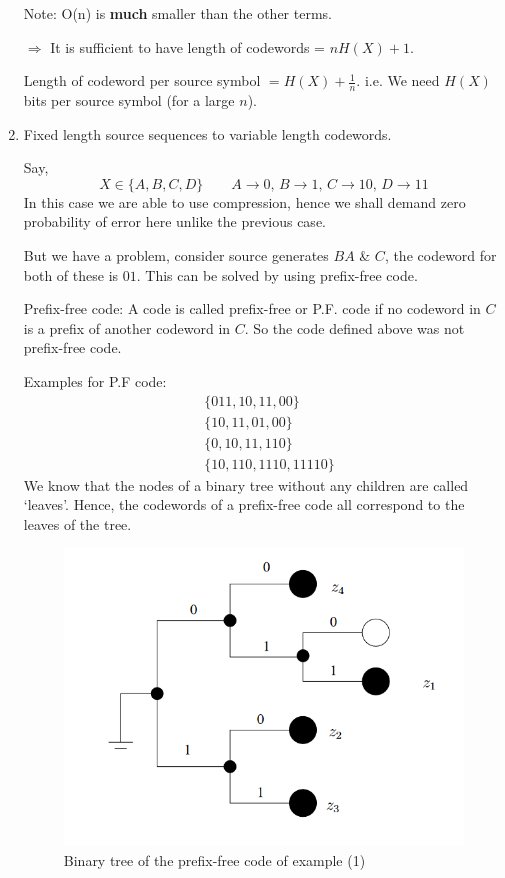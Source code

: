 \documentclass{article}
\begin{document}
\begin{enumerate}
    Note: O(n) is \textbf{much} smaller than the other terms.

    $\Rightarrow$ It is sufficient to have length of codewords = $nH(X)+1$.

    Length of codeword per source symbol $=H(X)+\frac{1}{n}$. i.e. We need $H(X)$ bits per source symbol (for a large $n$).

    \item Fixed length source sequences to variable length codewords.

    Say,
    $$ X \in \{ A,B,C,D\} \qquad A\to 0 ,\, B \to 1,\, C\to 10,\, D \to 11$$
    In this case we are able to use compression, hence we shall demand zero probability of error here unlike the previous case.

    But we have a problem, consider source generates $BA$ \& $C$, the codeword for both of these is $01$. This can be solved by using prefix-free code.

Prefix-free code: A code is called prefix-free or P.F. code if no codeword in $C$ is a prefix of another codeword in $C$. So the code defined above was not prefix-free code.

Examples for P.F code:
\begin{align}
    &\{ 011,10,11,00\} \\
        &\{ 10,11,01,00\} \\
        &\{ 0,10,11,110\} \\
        &\{ 10,110,1110,11110\}
    \end{align}
We know that the nodes of a binary tree without any children are called `leaves'. Hence, the codewords of a prefix-free code all correspond to the leaves of the tree.

\begin{figure}
    \includegraphics[width=\textwidth]{binary_tree.png}
    \caption{Binary tree of the prefix-free code of example (1)}
\end{figure}


\end{enumerate}
\end{document}
